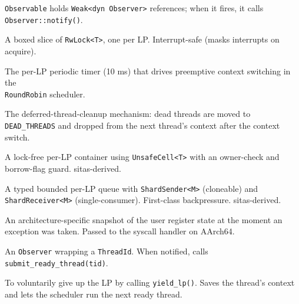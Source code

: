\begin{description}
        \texttt{Observable} holds \texttt{Weak<dyn Observer>} references;
        when it fires, it calls \texttt{Observer::notify()}.
    \item[PerLp<T>] A boxed slice of \texttt{RwLock<T>}, one per LP.
        Interrupt-safe (masks interrupts on acquire).
    \item[Quantum timer] The per-LP periodic timer (10 ms) that drives
        preemptive context switching in the \\ \texttt{RoundRobin} scheduler.
    \item[Reaper] The deferred-thread-cleanup mechanism: dead threads are
        moved to \texttt{DEAD\_THREADS} and dropped from the next thread's
        context after the context switch.
    \item[ShardLocal<T>] A lock-free per-LP container using
        \texttt{UnsafeCell<T>} with an owner-check and borrow-flag guard.
        sitas-derived.
    \item[ShardMailbox<M>] A typed bounded per-LP queue with
        \texttt{ShardSender<M>} (cloneable) and \\ \texttt{ShardReceiver<M>}
        (single-consumer). First-class backpressure. sitas-derived.
    \item[TrapFrame] An architecture-specific snapshot of the user register
        state at the moment an exception was taken. Passed to the syscall
        handler on AArch64.
    \item[Waker] An \texttt{Observer} wrapping a \texttt{ThreadId}. When
        notified, calls \texttt{submit\_ready\_thread(tid)}.
    \item[Yield] To voluntarily give up the LP by calling
        \texttt{yield\_lp()}. Saves the thread's context and lets the scheduler
        run the next ready thread.
\end{description}

\endinput
